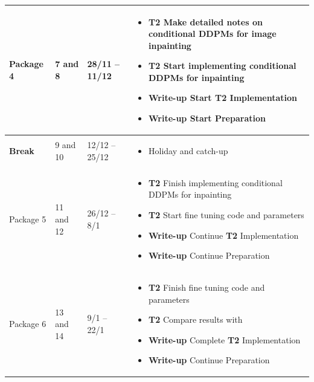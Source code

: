 \documentclass{article}
\begin{document}
\begin{longtable}{p{2.5cm}p{1.5cm}P{2.5cm}P{6.8cm}}
    Package 4 &
    7 and 8  &
    28/11 -- 11/12 &
    \begin{itemize}[label={--},noitemsep,leftmargin=*,topsep=0pt,partopsep=0pt]
      \item \textbf{T2} Make detailed notes on conditional DDPMs for image inpainting
      \item \textbf{T2} Start implementing conditional DDPMs for inpainting
      \item \textbf{Write-up} Start \textbf{T2} Implementation
      \item \textbf{Write-up} Start Preparation
    \end{itemize}\\
    \hline
    
    \textbf{Break} &
    9 and 10  &
    12/12 -- 25/12 &
    \begin{itemize}[label={--},noitemsep,leftmargin=*,topsep=0pt,partopsep=0pt]
      \item Holiday and catch-up
    \end{itemize}\\
    \hline
    
    Package 5 &
    11 and 12  &
    26/12 -- 8/1 &
    \begin{itemize}[label={--},noitemsep,leftmargin=*,topsep=0pt,partopsep=0pt]
      \item \textbf{T2} Finish implementing conditional DDPMs for inpainting
      \item \textbf{T2} Start fine tuning code and parameters
      \item \textbf{Write-up} Continue \textbf{T2} Implementation
      \item \textbf{Write-up} Continue Preparation
    \end{itemize}\\
    \hline
    
    Package 6 &
    13 and 14  &
    9/1 -- 22/1 &
    \begin{itemize}[label={--},noitemsep,leftmargin=*,topsep=0pt,partopsep=0pt]
      \item \textbf{T2} Finish fine tuning code and parameters
      \item \textbf{T2} Compare results with \cite{Saharia-2022}
      \item \textbf{Write-up} Complete \textbf{T2} Implementation
      \item \textbf{Write-up} Continue Preparation
    \end{itemize}\\
    \hline


\end{longtable}
\end{document}
